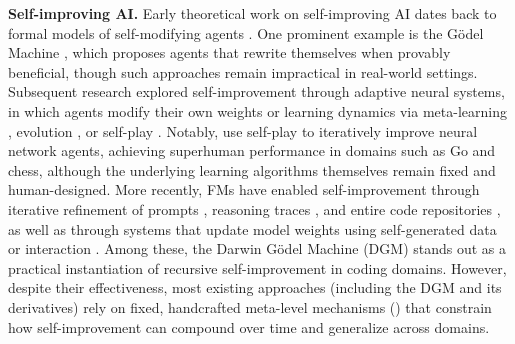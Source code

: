 \documentclass[]{fairmeta}
\begin{document}
\textbf{Self-improving AI.}
Early theoretical work on self-improving AI dates back to formal models of self-modifying agents \citep{hutter2003gentle}. One prominent example is the G\"odel Machine \citep{schmidhuber2003godel}, which proposes agents that rewrite themselves when provably beneficial, though such approaches remain impractical in real-world settings. Subsequent research explored self-improvement through adaptive neural systems, in which agents modify their own weights or learning dynamics via meta-learning \citep{schmidhuber1993neural, miconi2018differentiable, javed2019meta, beaulieu2020learning, miconi2020backpropamine, irie2022modern, chalvidal2022meta, oh2025discovering}, evolution \citep{stanley2002evolving, lange2023discovering, qiu2025evolution, zhao2025automated}, or self-play \citep{silver2016mastering, silver2017mastering, xia2025agent0, xia2026skillrl}. Notably, \citet{silver2017mastering} use self-play to iteratively improve neural network agents, achieving superhuman performance in domains such as Go and chess, although the underlying learning algorithms themselves remain fixed and human-designed. More recently, FMs have enabled self-improvement through iterative refinement of prompts \citep{fernando2023promptbreeder, wang2025evolving, zhang2025agentic, zhang2025recursive, ye2026meta}, reasoning traces \citep{zelikman2022star, yin2025godel, havrilla2024teaching, zhuge2024gptswarm}, and entire code repositories \citep{zhang2025darwin, wang2025huxley, xia2025live}, as well as through systems that update model weights using self-generated data or interaction \citep{wu2024copilot, zweiger2025self, wen2025unsupervised, wei2025toward}. Among these, the Darwin G\"odel Machine (DGM) \citep{zhang2025darwin} stands out as a practical instantiation of recursive self-improvement in coding domains. However, despite their effectiveness, most existing approaches (including the DGM and its derivatives) rely on fixed, handcrafted meta-level mechanisms () that constrain how self-improvement can compound over time and generalize across domains.
\end{document}
